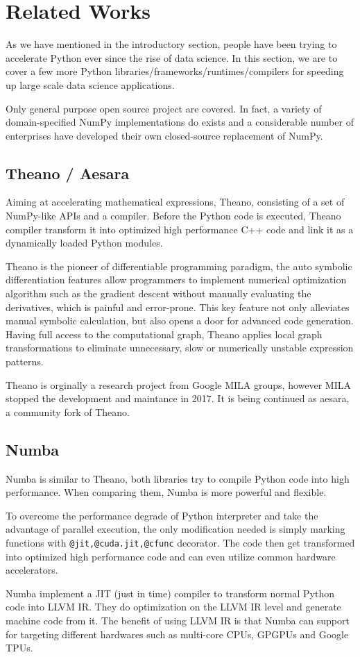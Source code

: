 \documentclass{article}
\newenvironment{newSec}[1]{
	\section{#1}
	\lhead{#1}
}{ \newpage }
\newenvironment{newSubsec}[1]{
	\subsection{#1}
}{}
\begin{document}
\begin{newSec}{Related Works}
	As we have mentioned in the introductory section, people have been trying to accelerate Python ever since the rise of data science.
	In this section, we are to cover a few more Python libraries/frameworks/runtimes/compilers for speeding up large scale data science applications.\par
	Only general purpose open source project are covered.
	In fact, a variety of domain-specified NumPy implementations do exists and a considerable number of enterprises have developed their own closed-source replacement of NumPy.
	\begin{newSubsec}{Theano / Aesara}
		Aiming at accelerating mathematical expressions, Theano\cite{Theano}, consisting of a set of NumPy-like APIs and a compiler.
		Before the Python code is executed, Theano compiler transform it into optimized high performance C++ code and link it as a dynamically loaded Python modules.\par
		Theano is the pioneer of differentiable programming paradigm, the auto symbolic differentiation features
		allow programmers to implement numerical optimization algorithm such as the gradient descent without manually evaluating the derivatives, which is painful and error-prone.
		This key feature not only alleviates manual symbolic calculation, but also opens a door for advanced code generation.
		Having full access to the computational graph, Theano applies local graph transformations to eliminate unnecessary, slow or numerically unstable expression patterns.\par
		Theano is orginally a research project from Google MILA groups, however MILA stopped the development and maintance in 2017.
		It is being continued as aesara, a community fork of Theano.
	\end{newSubsec}

	\begin{newSubsec}{Numba}
		Numba\cite{Numba} is similar to Theano, both libraries try to compile Python code into high performance. When comparing them, Numba is more powerful and flexible.\par
		To overcome the performance degrade of Python interpreter and take the advantage of parallel execution,
		the only modification needed is simply marking functions with \texttt{@jit,@cuda.jit,@cfunc} decorator.
		The code then get transformed into optimized high performance code and can even utilize common hardware accelerators.\par
		Numba implement a JIT (just in time) compiler to transform normal Python code into LLVM IR.
		They do optimization on the LLVM IR level and generate machine code from it.
		The benefit of using LLVM IR is that Numba can support for targeting different hardwares such as multi-core CPUs, GPGPUs and Google TPUs.
	\end{newSubsec}



\end{newSec}
\end{document}
